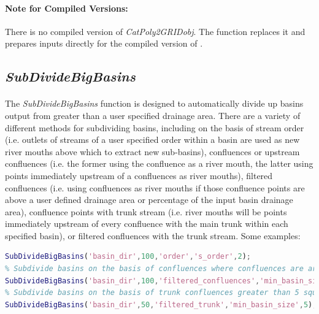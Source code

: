 \paragraph{Note for Compiled Versions:} There is no compiled version of \textit{CatPoly2GRIDobj}. The  function replaces it and prepares inputs directly for the compiled version of .

\subsection{\textit{SubDivideBigBasins}} \label{sec:SbDvdBsn}
\paragraph{}The \textit{SubDivideBigBasins} function is designed to automatically divide up basins output from  greater than a user specified drainage area. There are a variety of different methods for subdividing basins, including on the basis of stream order (i.e. outlets of streams of a user specified order within a basin are used as new river mouths above which to extract new sub-basins), confluences or upstream confluences (i.e. the former using the confluence as a river mouth, the latter using points immediately upstream of a confluences as river mouths), filtered confluences (i.e. using confluences as river mouths if those confluence points are above a user defined drainage area or percentage of the input basin drainage area), confluence points with trunk stream (i.e. river mouths will be points immediately upstream of every confluence with the main trunk within each specified basin), or filtered confluences with the trunk stream. Some examples:

\begin{lstlisting}[language=Matlab]
% Subdivide basins stored in the 'basin_dir' folder that are greater than 100 square kilometers in drainage  on the basis of stream order with outlets of second order streams serving as river mouths
SubDivideBigBasins('basin_dir',100,'order','s_order',2);
% Subdivide basins on the basis of confluences where confluences are areas with draiange areas greater than 5 square kilometers in drainage area
SubDivideBigBasins('basin_dir',100,'filtered_confluences','min_basin_size',5);
% Subdivide basins on the basis of trunk confluences greater than 5 square kilometers for any main basin greater than 50 square kilometers
SubDivideBigBasins('basin_dir',50,'filtered_trunk','min_basin_size',5);
\end{lstlisting}


